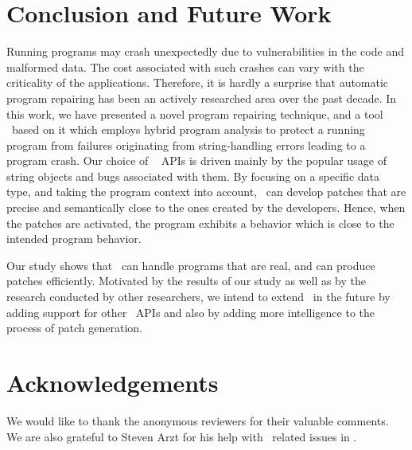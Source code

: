 \section{Conclusion and Future Work}
\label{sec:conc}

Running programs may crash unexpectedly due to vulnerabilities in the code and
malformed data.
The cost associated with such crashes can vary with the criticality of the
applications. Therefore, it is hardly a surprise that automatic program
repairing has been an actively researched area over the past decade.
In this work, we have presented a novel program repairing technique, and a tool
\tool\ based on it which employs hybrid program analysis to protect a running
program from failures originating from string-handling errors leading to a
program crash.
Our choice of \java\  APIs is driven mainly by the popular usage of
string objects and bugs associated with them.
By focusing on a specific data type, and taking the program context into
account, \tool\ can develop patches that are precise and  semantically close to
the ones created by the developers.
Hence, when the patches are activated, the program exhibits a behavior which is
close to the intended program behavior.

Our study shows that \tool\ can handle programs that are real, and can produce
patches efficiently. Motivated by the results of our study as well as by the
research conducted by other researchers, we intend to extend \tool\ in the
future by adding support for other \java\ APIs and also by adding more
intelligence to the process of patch generation.

\section{Acknowledgements}
\label{sec:acks}

We would like to thank the anonymous reviewers for their valuable comments. We
are also grateful to Steven Arzt for his help with \soot\ related issues in
\tool.

